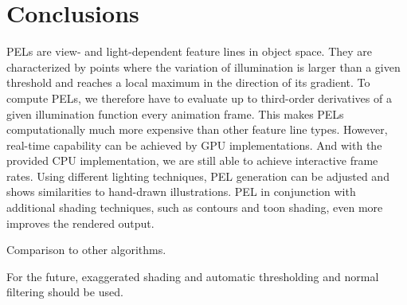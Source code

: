 \documentclass[9pt,fleqn,twoside,twocolumn]{stdglobal}
\begin{document}
\section{Conclusions}
  PELs are view- and light-dependent feature lines in object space.
  They are characterized by points where the variation of illumination is larger than a given threshold and reaches a local maximum in the direction of its gradient.
  To compute PELs, we therefore have to evaluate up to third-order derivatives of a given illumination function every animation frame.
  This makes PELs computationally much more expensive than other feature line types.
  However, real-time capability can be achieved by GPU implementations.
  And with the provided CPU implementation, we are still able to achieve interactive frame rates.
  Using different lighting techniques, PEL generation can be adjusted and shows similarities to hand-drawn illustrations.
  PEL in conjunction with additional shading techniques, such as contours and toon shading, even more improves the rendered output.

  Comparison to other algorithms.

  For the future, exaggerated shading and automatic thresholding and normal filtering should be used.

\nocite{*}
\AtNextBibliography{\footnotesize}
\printbibliography[heading=bibintoc]

\appendix
\end{document}
